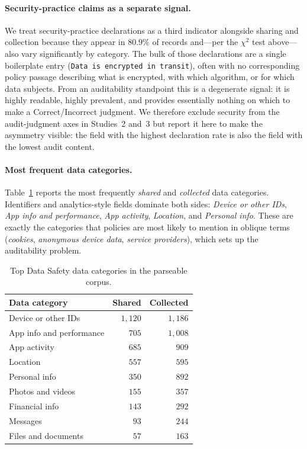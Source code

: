 \documentclass[11pt,a4paper]{article}
\begin{document}
\paragraph{Security-practice claims as a separate signal.}
We treat security-practice declarations as a third indicator alongside
sharing and collection because they appear in $80.9\%$ of records
and---per the $\chi^{2}$ test above---also vary significantly by
category. The bulk of those declarations are a single boilerplate
entry (\texttt{Data is encrypted in transit}), often with no
corresponding policy passage describing what is encrypted, with which
algorithm, or for which data subjects. From an auditability standpoint
this is a degenerate signal: it is highly readable, highly prevalent,
and provides essentially nothing on which to make a Correct/Incorrect
judgment. We therefore exclude security from the audit-judgment axes in
Studies~2 and~3 but report it here to make the asymmetry visible: the
field with the highest declaration rate is also the field with the
lowest audit content.

\paragraph{Most frequent data categories.}
Table~\ref{tab:topcats} reports the most frequently \emph{shared} and
\emph{collected} data categories. Identifiers and analytics-style
fields dominate both sides: \emph{Device or other IDs}, \emph{App info
and performance}, \emph{App activity}, \emph{Location}, and
\emph{Personal info}. These are exactly the categories that policies
are most likely to mention in oblique terms (\emph{cookies},
\emph{anonymous device data}, \emph{service providers}), which sets up
the auditability problem.

\begin{table}[t]
\centering\small
\caption{Top Data Safety data categories in the parseable corpus.}
\label{tab:topcats}
\begin{tabular}{lrr}
\toprule
Data category & Shared & Collected \\
\midrule
Device or other IDs       & $1{,}120$ & $1{,}186$ \\
App info and performance  & $705$     & $1{,}008$ \\
App activity              & $685$     & $909$     \\
Location                  & $557$     & $595$     \\
Personal info             & $350$     & $892$     \\
Photos and videos         & $155$     & $357$     \\
Financial info            & $143$     & $292$     \\
Messages                  & $93$      & $244$     \\
Files and documents       & $57$      & $163$     \\
\bottomrule
\end{tabular}
\end{table}
\end{document}

